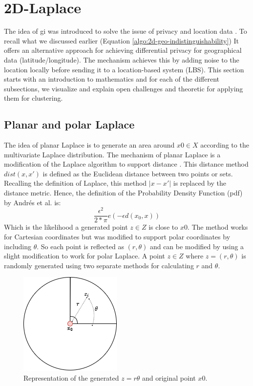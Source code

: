 
\section{2D-Laplace}
The idea of \gls{gi} was introduced to solve the issue of privacy and location data \citep{DBLP:journals/corr/abs-1212-1984}.
To recall what we discussed earlier (Equation \ref{algo:2d-geo-indistinguishability})
It offers an alternative approach for achieving differential privacy for geographical data (latitude/longitude).
The mechanism achieves this by adding noise to the location locally before sending it to a location-based system (LBS).
This section starts with an introduction to mathematics and for each of the different subsections, we visualize and explain open challenges and theoretic for applying them for clustering.
\subsection{Planar and polar Laplace}
The idea of planar Laplace is to generate an area around $x0 \in X$ according to the multivariate Laplace distribution.
The mechanism of planar Laplace is a modification of the Laplace algorithm to support distance \citep{DBLP:journals/corr/abs-1212-1984}.
This distance method $dist(x, x')$ is defined as the Euclidean distance between two points or sets.
Recalling the definition of Laplace, this method $|x-x'|$ is replaced by the distance metric.
Hence, the definition of the Probability Density Function (pdf) by Andrés et al. is:
\begin{equation}
  \frac{\epsilon^2}{2*\pi}e(-\epsilon d(x_0, x))
\end{equation}
Which is the likelihood a generated point $z \in Z$ is close to $x0$.
The method works for Cartesian coordinates but was modified to support polar coordinates by including $\theta$.
So each point is reflected as $(r, \theta)$ and can be modified by using a slight modification to work for polar Laplace.
A point $z \in Z$ where $z = (r, \theta)$ is randomly generated using two separate methods for calculating $r$ and $\theta$.
\begin{figure}[h]
  \includegraphics[scale=0.6]{TheorethicalFramework/ND-Laplace/Images/polar-laplace.png}
  \centering
  \caption{Representation of the generated $z = {r \theta}$ and original point $x0$.}
  \label{figure:parea}
\end{figure}

